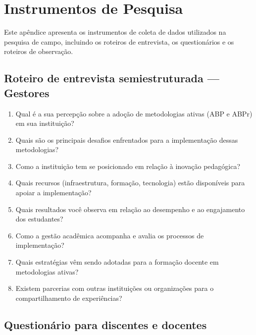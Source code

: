 \documentclass[12pt,a4paper,twoside,openright]{book}
\begin{document}


\printbibliography[title={Refer\^encias Bibliogr\'aficas}]

\appendix
\renewcommand{\appendixname}{Apêndice}

\chapter{Instrumentos de Pesquisa}
\label{apx:instrumentos}

Este apêndice apresenta os instrumentos de coleta de dados utilizados na pesquisa de campo, incluindo os roteiros de entrevista, os questionários e os roteiros de observação.

\section{Roteiro de entrevista semiestruturada --- Gestores}
\label{sec:roteiro_entrevista}

\begin{enumerate}
    \item Qual é a sua percepção sobre a adoção de metodologias ativas (ABP e ABPr) em sua instituição?
    \item Quais são os principais desafios enfrentados para a implementação dessas metodologias?
    \item Como a instituição tem se posicionado em relação à inovação pedagógica?
    \item Quais recursos (infraestrutura, formação, tecnologia) estão disponíveis para apoiar a implementação?
    \item Quais resultados você observa em relação ao desempenho e ao engajamento dos estudantes?
    \item Como a gestão acadêmica acompanha e avalia os processos de implementação?
    \item Quais estratégias vêm sendo adotadas para a formação docente em metodologias ativas?
    \item Existem parcerias com outras instituições ou organizações para o compartilhamento de experiências?
\end{enumerate}

\section{Questionário para discentes e docentes}
\label{sec:questionario}
\end{document}
